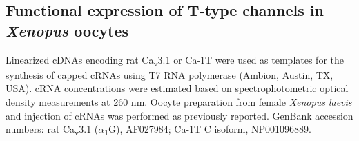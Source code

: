 \subsection*{Functional expression of T-type channels in \emph{Xenopus} oocytes}

Linearized cDNAs encoding rat Ca\textsubscript{v}3.1 or Ca-\alpha1T were used as templates for the synthesis of capped cRNAs using T7 RNA polymerase (Ambion, Austin, TX, USA).
cRNA concentrations were estimated based on spectrophotometric optical density measurements at 260 nm.
Oocyte preparation from female \emph{Xenopus laevis} and injection of cRNAs was performed as previously reported\cite{kang:2006aa}.
GenBank accession numbers: rat Ca\textsubscript{v}3.1 ($\alpha$\textsubscript{1}G), AF027984\cite{PerezReyes:1998gn}; Ca-\alpha1T C isoform, NP001096889.
